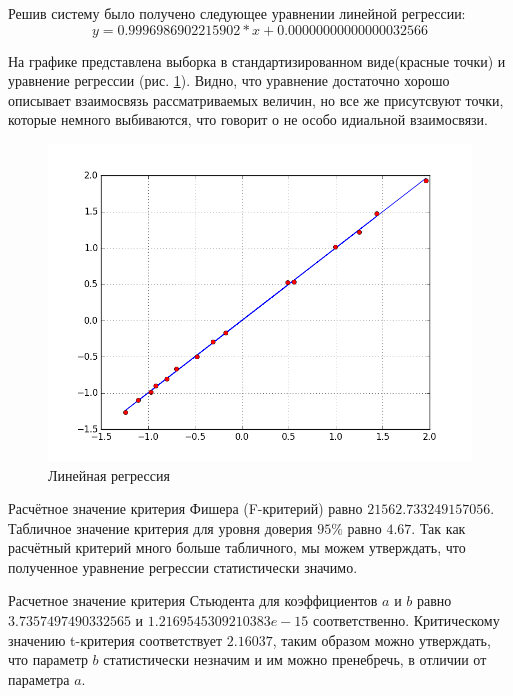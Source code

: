 \documentclass[a4paper,12pt]{article}
\begin{document}
\vfill
Решив систему было получено следующее уравнении линейной регрессии:
$$y = 0.9996986902215902*x+0.00000000000000032566$$

На графике представлена выборка в стандартизированном виде(красные точки) и уравнение регрессии (рис. \ref{fig:im_1}). Видно, что уравнение достаточно хорошо описывает взаимосвязь рассматриваемых величин, но все же присутсвуют точки, которые немного выбиваются, что говорит о не особо идиальной взаимосвязи.

\begin{center}
	\begin{figure}[h]
		\centering
   		\includegraphics[scale=0.7]{figure_1.png}
   		\caption{Линейная регрессия}
   		\label{fig:im_1}
    \end{figure}
\end{center}

\vspace{0.5cm}
Расчётное значение критерия Фишера (F-критерий) равно $21562.733249157056$. Табличное значение критерия для уровня доверия $95\%$ равно $4.67$. Так как расчётный критерий много больше табличного, мы можем утверждать, что полученное уравнение регрессии статистически значимо.

\vspace{0.5cm}
Расчетное значение критерия Стьюдента для коэффициентов $a$ и $b$ равно\\ $3.7357497490332565$ и $1.2169545309210383e-15$ соответственно. Критическому значению t-критерия соответствует $2.16037$, таким образом можно утверждать, что параметр $b$ статистически незначим и им можно пренебречь, в отличии от параметра $a$.
\end{document}

